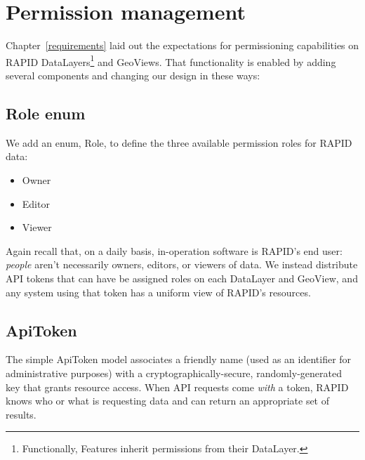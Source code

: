 \section{Permission management}
Chapter~\ref{requirements} laid out the expectations for permissioning capabilities on RAPID DataLayers\footnote{Functionally, Features inherit permissions from their DataLayer.} and GeoViews. That functionality is enabled by adding several components and changing our design in these ways:

\subsection{Role enum}
We add an enum, Role, to define the three available permission roles for RAPID data:
\begin{itemize}
  \item Owner
  \item Editor
  \item Viewer
\end{itemize}

Again recall that, on a daily basis, in-operation software is RAPID's end user: \textit{people} aren't necessarily owners, editors, or viewers of data. We instead distribute API tokens that can have be assigned roles on each DataLayer and GeoView, and any system using that token has a uniform view of RAPID's resources.

\subsection{ApiToken}
The simple ApiToken model associates a friendly name (used as an identifier for administrative purposes) with a cryptographically-secure, randomly-generated key that grants resource access. When API requests come \textit{with} a token, RAPID knows who or what is requesting data and can return an appropriate set of results.


